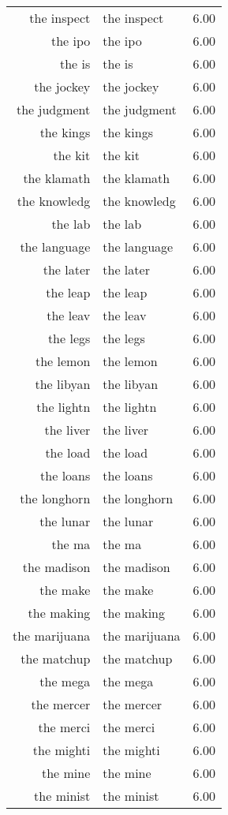 \begin{table}[ht]
\begin{tabular}{rlr}
  the inspect & the inspect & 6.00 \\ 
  the ipo & the ipo & 6.00 \\ 
  the is & the is & 6.00 \\ 
  the jockey & the jockey & 6.00 \\ 
  the judgment & the judgment & 6.00 \\ 
  the kings & the kings & 6.00 \\ 
  the kit & the kit & 6.00 \\ 
  the klamath & the klamath & 6.00 \\ 
  the knowledg & the knowledg & 6.00 \\ 
  the lab & the lab & 6.00 \\ 
  the language & the language & 6.00 \\ 
  the later & the later & 6.00 \\ 
  the leap & the leap & 6.00 \\ 
  the leav & the leav & 6.00 \\ 
  the legs & the legs & 6.00 \\ 
  the lemon & the lemon & 6.00 \\ 
  the libyan & the libyan & 6.00 \\ 
  the lightn & the lightn & 6.00 \\ 
  the liver & the liver & 6.00 \\ 
  the load & the load & 6.00 \\ 
  the loans & the loans & 6.00 \\ 
  the longhorn & the longhorn & 6.00 \\ 
  the lunar & the lunar & 6.00 \\ 
  the ma & the ma & 6.00 \\ 
  the madison & the madison & 6.00 \\ 
  the make & the make & 6.00 \\ 
  the making & the making & 6.00 \\ 
  the marijuana & the marijuana & 6.00 \\ 
  the matchup & the matchup & 6.00 \\ 
  the mega & the mega & 6.00 \\ 
  the mercer & the mercer & 6.00 \\ 
  the merci & the merci & 6.00 \\ 
  the mighti & the mighti & 6.00 \\ 
  the mine & the mine & 6.00 \\ 
  the minist & the minist & 6.00 \\ 

\end{tabular}
\end{table}
